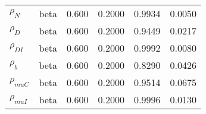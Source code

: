 \begin{center}
\begin{longtable}{llcccc}
${\rho_N}$ & beta &   0.600 & 0.2000 &   0.9934 &  0.0050 \\ 
${\rho_D}$ & beta &   0.600 & 0.2000 &   0.9449 &  0.0217 \\ 
${\rho_{DI}}$ & beta &   0.600 & 0.2000 &   0.9992 &  0.0080 \\ 
${\rho_b}$ & beta &   0.600 & 0.2000 &   0.8290 &  0.0426 \\ 
${\rho_{muC}}$ & beta &   0.600 & 0.2000 &   0.9514 &  0.0675 \\ 
${\rho_{muI}}$ & beta &   0.600 & 0.2000 &   0.9996 &  0.0130 \\ 
\end{longtable}
 \end{center}
